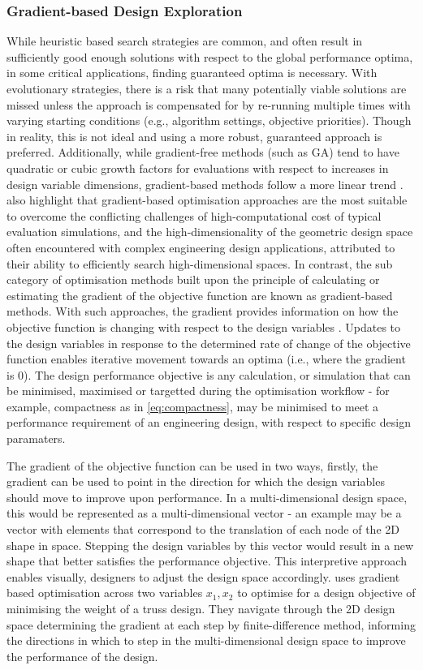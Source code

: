 \documentclass{article}
\begin{document}
\subsubsection{Gradient-based Design Exploration}
While heuristic based search strategies are common, and often result in sufficiently good enough solutions with respect to the global performance optima, in some critical applications, finding guaranteed optima is necessary. With evolutionary strategies, there is a risk that many potentially viable solutions are missed unless the approach is compensated for by re-running  multiple times with varying starting conditions (e.g., algorithm settings, objective priorities). Though in reality, this is not ideal and using a more robust, guaranteed approach is preferred. Additionally, while gradient-free methods (such as GA) tend to have quadratic or cubic growth factors for evaluations with respect to increases in design variable dimensions, gradient-based methods follow a more linear trend \citep{Li2022}. \cite{Li2022} also highlight that gradient-based optimisation approaches are the most suitable to overcome the conflicting challenges of high-computational cost of typical evaluation simulations, and the high-dimensionality of the geometric design space often encountered with complex engineering design applications, attributed to their ability to efficiently search high-dimensional spaces.
In contrast, the sub category of optimisation methods built upon the principle of calculating or estimating the gradient of the objective function are known as gradient-based methods. With such approaches, the gradient provides information on how the objective function is changing with respect to the design variables \citep{Brown:2018:2518-6582:1}. Updates to the design variables in response to the determined rate of change of the objective function enables iterative movement towards an optima (i.e., where the gradient is 0). The design performance objective is any calculation, or simulation that can be minimised, maximised or targetted during the optimisation workflow - for example, compactness as in \eqref{eq:compactness}, may be minimised to meet a performance requirement of an engineering design, with respect to specific design paramaters.

The gradient of the objective function can be used in two ways, firstly, the gradient can be used to point in the direction for which the design variables should move to improve upon performance. In a multi-dimensional design space, this would be represented as a multi-dimensional vector - an example may be a vector with elements that correspond to the translation of each node of the 2D shape in space. Stepping the design variables by this vector would result in a new shape that better satisfies the performance objective. This interpretive approach enables visually, designers to adjust the design space accordingly. \cite{Brown:2018:2518-6582:1} uses gradient based optimisation across two variables $x_1,x_2$ to optimise for a design objective of minimising the weight of a truss design. They navigate through the 2D design space determining the gradient at each step by finite-difference method, informing the directions in which to step in the multi-dimensional design space to improve the performance of the design.
\end{document}

